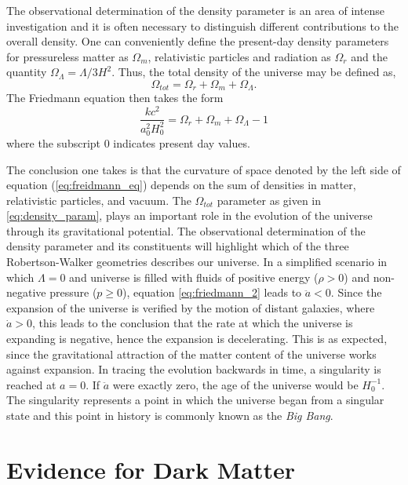 The observational determination of the density parameter is an area of intense investigation and it is often necessary to distinguish different contributions to the overall density. One can conveniently define the present-day density parameters for pressureless matter as $\Omega_{m}$, relativistic particles and radiation as $\Omega_r$ and the quantity $\Omega_{\Lambda} = \Lambda/3H^2$. Thus, the total density of the universe may be defined as, 
%
\begin{equation}
  \Omega_{tot} = \Omega_{r} + \Omega_{m} + \Omega_{\Lambda}. 
\end{equation}
%
The Friedmann equation then takes the form
%
\begin{equation}\label{eq:freidmann_eq}
  \frac{kc^2}{a_{0}^2H_{0}^2} = \Omega_{r} + \Omega_{m} + \Omega_{\Lambda} - 1
\end{equation}
%
where the subscript 0 indicates present day values. 

The conclusion one takes is that the curvature of space denoted by the left side of equation (\ref{eq:freidmann_eq}) depends on the sum of densities in matter, relativistic particles, and vacuum.  The $\Omega_{tot}$ parameter as given in \ref{eq:density_param}, plays an important role in the evolution of the universe through its gravitational potential. The observational determination of the density parameter and its constituents will highlight which of the three Robertson-Walker geometries describes our universe. In a simplified scenario in which $\Lambda = 0$ and universe is filled with fluids of positive energy ($\rho > 0$) and non-negative pressure ($p \geq 0$), equation \ref{eq:friedmann_2} leads to $\ddot{a} < 0$. Since the expansion of the universe is verified by the motion of distant galaxies, where $\dot{a} > 0$, this leads to the conclusion that the rate at which the universe is expanding is negative, hence the expansion is decelerating. This is as expected, since the gravitational attraction of the matter content of the universe works against expansion. In tracing the evolution backwards in time, a singularity is reached at $a = 0$. If $\ddot{a}$ were exactly zero, the age of the universe would be $H_{0}^{-1}$. The singularity represents a point in which the universe began from a singular state and this point in history is commonly known as the \textit{Big Bang}.  


\section{Evidence for Dark Matter}
\label{sec:darkmatter}

